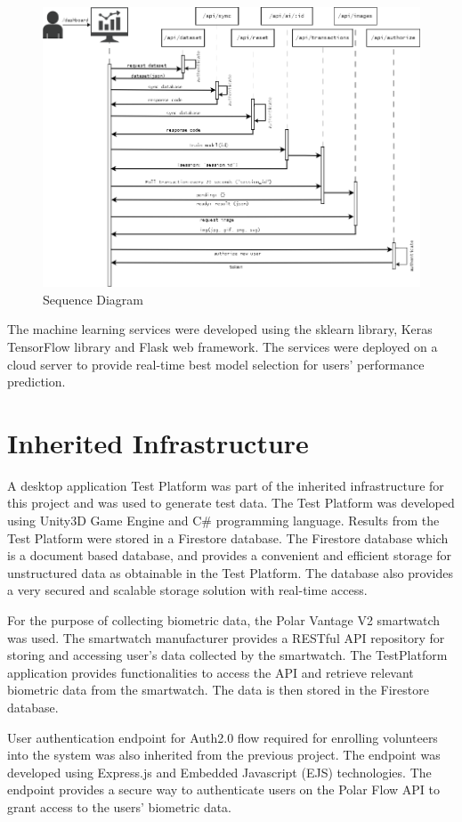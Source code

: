\begin{figure}[h!]
    \includegraphics[width=1.0\textwidth]{images/seq_diagram.png}
    \caption{Sequence Diagram}
    \label{image:seq_diagram}
\end{figure}

The machine learning services were developed using the 
sklearn library, Keras TensorFlow library and Flask web framework. The services were deployed on a cloud server to provide real-time best
model selection for users' performance prediction.

\section{Inherited Infrastructure}

A desktop application Test Platform was part of the inherited infrastructure for this project and was used to generate test data.
The Test Platform was developed using Unity3D Game Engine and C\# programming language. Results from the Test Platform were stored in 
a Firestore database. The Firestore database which is a document based database, and provides a convenient and efficient storage for 
unstructured data as obtainable in the Test Platform. The database also provides a very secured and scalable storage solution with 
real-time access.

For the purpose of collecting biometric data, the Polar Vantage V2 smartwatch was used. The smartwatch manufacturer provides a RESTful API
repository for storing and accessing user's data collected by the smartwatch. The TestPlatform application provides functionalities to 
access the API and retrieve relevant biometric data from the smartwatch. The data is then stored in the Firestore database.

User authentication endpoint for Auth2.0 flow required for enrolling volunteers into the system was also inherited from the previous project. 
The endpoint was developed using Express.js and Embedded Javascript (EJS) technologies. The endpoint provides a secure way to authenticate
users on the Polar Flow API to grant access to the users' biometric data. 